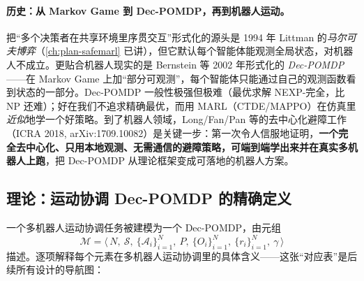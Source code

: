 \paragraph{历史：从 Markov Game 到 Dec-POMDP，再到机器人运动。}
把“多个决策者在共享环境里序贯交互”形式化的源头是 1994 年 Littman 的\emph{马尔可夫博弈}\cite{littman1994markov}（\cref{ch:plan-safemarl} 已讲），但它默认每个智能体能观测全局状态，对机器人不成立。更贴合机器人现实的是 Bernstein 等 2002 年形式化的 \emph{Dec-POMDP}\cite{bernstein2002decpomdp}——在 Markov Game 上加“部分可观测”，每个智能体只能通过自己的观测函数看到状态的一部分。Dec-POMDP 一般性极强但极难（最优求解 NEXP-完全，比 NP 还难）；好在我们不追求精确最优，而用 MARL（CTDE/MAPPO）在仿真里\emph{近似}地学一个好策略。到了机器人领域，Long/Fan/Pan 等的去中心化避障工作\cite{long2018collision}（ICRA 2018, arXiv:1709.10082）是关键一步：第一次令人信服地证明，\textbf{一个完全去中心化、只用本地观测、无需通信的避障策略，可端到端学出来并在真实多机器人上跑}，把 Dec-POMDP 从理论框架变成可落地的机器人方案。

\subsection{理论：运动协调 Dec-POMDP 的精确定义}
\label{sec:mc-decpomdp-def}

一个多机器人运动协调任务被建模为一个 Dec-POMDP，由元组
\begin{equation}
  \mathcal{M}=\big\langle\, N,\ \mathcal{S},\ \{\mathcal{A}_i\}_{i=1}^N,\ P,\ \{O_i\}_{i=1}^N,\ \{r_i\}_{i=1}^N,\ \gamma \,\big\rangle
  \label{eq:mc-decpomdp}
\end{equation}
描述\cite{bernstein2002decpomdp}。逐项解释每个元素在多机器人运动协调里的具体含义——这张“对应表”是后续所有设计的导航图：

